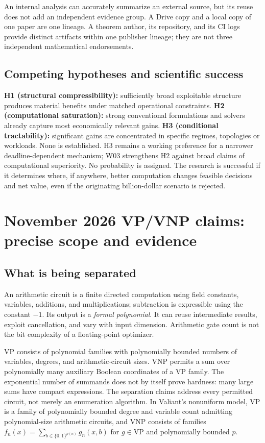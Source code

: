\documentclass[11pt,letterpaper]{article}
\begin{document}
An internal analysis can accurately summarize an external source, but its reuse does not add an independent evidence group. A Drive copy and a local copy of one paper are one lineage. A theorem author, its repository, and its CI logs provide distinct artifacts within one publisher lineage; they are not three independent mathematical endorsements.

\subsection{Competing hypotheses and scientific success}
\textbf{H1 (structural compressibility):} sufficiently broad exploitable structure produces material benefits under matched operational constraints. \textbf{H2 (computational saturation):} strong conventional formulations and solvers already capture most economically relevant gains. \textbf{H3 (conditional tractability):} significant gains are concentrated in specific regimes, topologies or workloads. None is established. H3 remains a working preference for a narrower deadline-dependent mechanism; W03 strengthens H2 against broad claims of computational superiority. No probability is assigned. The research is successful if it determines where, if anywhere, better computation changes feasible decisions and net value, even if the originating billion-dollar scenario is rejected.

\section{November 2026 VP/VNP claims: precise scope and evidence}
\label{sec:vp}
\subsection{What is being separated}
An arithmetic circuit is a finite directed computation using field constants, variables, additions, and multiplications; subtraction is expressible using the constant $-1$. Its output is a \emph{formal polynomial}. It can reuse intermediate results, exploit cancellation, and vary with input dimension. Arithmetic gate count is not the bit complexity of a floating-point optimizer.

VP consists of polynomial families with polynomially bounded numbers of variables, degrees, and arithmetic-circuit sizes. VNP permits a sum over polynomially many auxiliary Boolean coordinates of a VP family. The exponential number of summands does not by itself prove hardness: many large sums have compact expressions. The separation claims address every permitted circuit, not merely an enumeration algorithm. In Valiant's nonuniform model, VP is a family of polynomially bounded degree and variable count admitting polynomial-size arithmetic circuits, and VNP consists of families $f_n(x)=\sum_{b\in\{0,1\}^{p(n)}}g_n(x,b)$ for $g\in\mathrm{VP}$ and polynomially bounded $p$.\cite{valiant}
\end{document}
